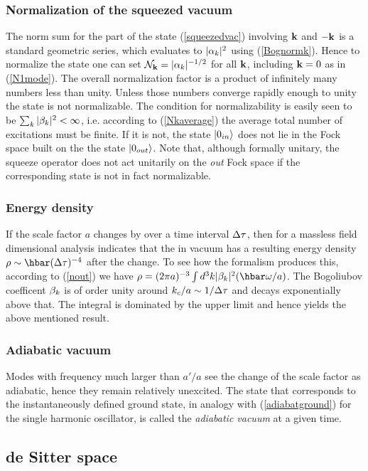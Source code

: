 \documentclass[12pt]{article}
\begin{document}
\subsubsection{Normalization of the squeezed vacuum}
The norm sum for the part of the state  (\ref{squeezedvac})
involving ${\bf k}$ and $-{\bf k}$ 
is a standard geometric series, which evaluates 
to $|\alpha_k|^2$ using (\ref{Bognormk}). 
Hence to normalize the state one can set
${\cal N}_\bk=|\a_k|^{-1/2}$ for all ${\bf k}$, including 
${\bf k}=0$ as in (\ref{N1mode}). The overall normalization factor 
is a product of infinitely many numbers less than unity. Unless
those numbers converge rapidly enough to unity the state is 
not normalizable. The condition for normalizability is easily seen to
be $\sum_{k}|\beta_k|^2<\infty$, i.e. according to (\ref{Nkaverage})
the average total number of excitations must be finite. If it is
not, the state $|0_{in}\rangle$ does not lie in the Fock space built on the 
the state  $|0_{out}\rangle$. Note that,
although formally unitary, the squeeze operator does not 
act unitarily on the {\it out} Fock space if the corresponding state is 
not in fact normalizable.

\subsubsection{Energy density}
If the scale factor $a$ changes by over a time interval $\Delta\tau$,
then for a massless field dimensional analysis indicates that the 
in vacuum has a resulting energy density $\rho\sim \hbar(\D\t)^{-4}$ after the
change. To see how the formalism produces this, according to (\ref{nout})
we have $\r=(2\pi a)^{-3}\int d^3k |\b_k|^2 (\hbar\o/a)$. The Bogoliubov
coefficent $\beta_k$ is of order unity around $k_c/a\sim 1/\Delta \tau$ and decays
exponentially above that. The integral is dominated by the upper limit 
and hence yields the above mentioned result.

\subsubsection{Adiabatic vacuum}
Modes with frequency 
much larger than $a'/a$ see the change of the scale factor
as adiabatic, hence they remain relatively unexcited.
The state that corresponds to the instantaneously defined
ground state, in analogy with (\ref{adiabatground}) for the
single harmonic oscillator, is called the {\it adiabatic vacuum}
at a given time. 

\subsection{de Sitter space}
\end{document}
